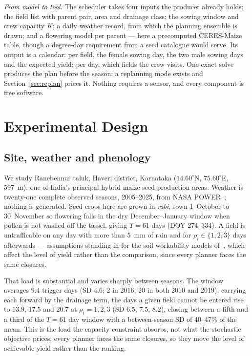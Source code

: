 \documentclass[10pt,twocolumn]{article}
\begin{document}
\emph{From model to tool.} The scheduler takes four inputs the producer
already holds: the field list with parent pair, area and drainage class; the
sowing window and crew capacity $K$; a daily weather record, from which the
planning ensemble is drawn; and a flowering model per parent --- here a
precomputed CERES-Maize table, though a degree-day requirement from a seed
catalogue would serve. Its output is a calendar: per field, the female
sowing day, the two male sowing days and the expected yield; per day, which
fields the crew visits. One exact solve produces the plan before the season;
a replanning mode exists and Section~\ref{sec:replan} prices it. Nothing
requires a sensor, and every component is free software.

\section{Experimental Design}
\label{sec:design}

\subsection{Site, weather and phenology}

We study Ranebennur taluk, Haveri district, Karnataka ($14.60^\circ$N,
$75.60^\circ$E, 597~m), one of India's principal hybrid maize seed
production areas. Weather is twenty-one complete observed seasons,
2005--2025, from NASA POWER~\cite{power}; nothing is generated. Seed crops here are grown in
\emph{rabi}, sown 1~October to 30~November so flowering falls in the dry
December--January window when pollen is not washed off the tassel, giving
$T = 61$ days (DOY 274--334). A field is untrafficable on any day with more
than 5~mm of rain and for $\rho_i \in \{1,2,3\}$ days afterwards ---
assumptions standing in for the soil-workability models
of~\cite{bagheri2025}, which affect the level of yield rather than the
comparison, since every planner faces the same closures.

That load is substantial and varies sharply between seasons. The window
averages $9.4$ trigger days (SD $4.6$; 2 in 2016, 20 in both 2010 and 2019);
carrying each forward by the drainage term, the days a given field cannot be
entered rise to $13.9$, $17.5$ and $20.7$ at $\rho_i = 1, 2, 3$ (SD $6.5$,
$7.5$, $8.2$), closing between a fifth and a third of the $T = 61$ day
window with a between-season SD of 40--47\% of the mean. This is the load
the capacity constraint absorbs, not what the stochastic objective prices:
every planner faces the same closures, so they move the level of achievable
yield rather than the ranking.
\end{document}

